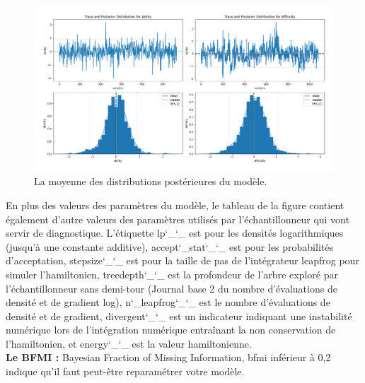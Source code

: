 \begin{figure}[H]
	\begin{center}
		\includegraphics[width=\textwidth]{images/chapitre7/params_posterior_distribution.png}
	\end{center}
	\caption{La moyenne des distributions postérieures du modèle.}
	\label{params_posterior_distribution}
\end{figure}

En plus des valeurs des paramètres du modèle, le tableau de la figure contient également d’autre valeurs des paramètres utilisés par l'échantillonneur qui vont servir de diagnostique.
L'étiquette \colorbox{gray!30}{lp\char`_\char`_} est pour les densités logarithmiques (jusqu'à une constante additive), \colorbox{gray!30}{accept\char`_stat\char`_\char`_} est pour les probabilités d'acceptation, \colorbox{gray!30}{stepsize\char`_\char`_} est pour la taille de pas de l'intégrateur leapfrog pour simuler l'hamiltonien, \colorbox{gray!30}{treedepth\char`_\char`_} est la profondeur de l'arbre exploré par l'échantillonneur sans demi-tour (Journal base 2 du nombre d'évaluations de densité et de gradient log), \colorbox{gray!30}{n\char`_leapfrog\char`_\char`_} est le nombre d'évaluations de densité et de gradient, \colorbox{gray!30}{divergent\char`_\char`_} est un indicateur indiquant une instabilité numérique lors de l'intégration numérique entraînant la non conservation de l'hamiltonien, et \colorbox{gray!30}{energy\char`_\char`_} est la valeur hamiltonienne. \\

\textbf{Le BFMI :} Bayesian Fraction of Missing Information, bfmi inférieur à 0,2 indique qu’il faut peut-être reparamétrer votre modèle.


